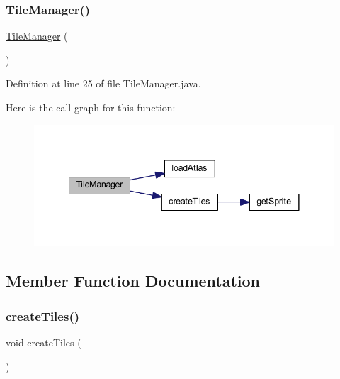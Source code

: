 \subsubsection{\texorpdfstring{Tile\+Manager()}{TileManager()}}
{\footnotesize\ttfamily \hyperlink{classblocchi_1_1_tile_manager}{Tile\+Manager} (\begin{DoxyParamCaption}{ }\end{DoxyParamCaption})}



Definition at line 25 of file Tile\+Manager.\+java.

Here is the call graph for this function\+:
\nopagebreak
\begin{figure}[H]
\begin{center}
\leavevmode
\includegraphics[width=341pt]{classblocchi_1_1_tile_manager_a041c1b12a4eb5574dfedf0af6393c014_cgraph}
\end{center}
\end{figure}


\subsection{Member Function Documentation}
\mbox{\label{classblocchi_1_1_tile_manager_abb7fa074b36e6e355db16761115fb367}} 
\subsubsection{\texorpdfstring{create\+Tiles()}{createTiles()}}
{\footnotesize\ttfamily void create\+Tiles (\begin{DoxyParamCaption}{ }\end{DoxyParamCaption})\hspace{0.3cm}{\ttfamily [private]}}



